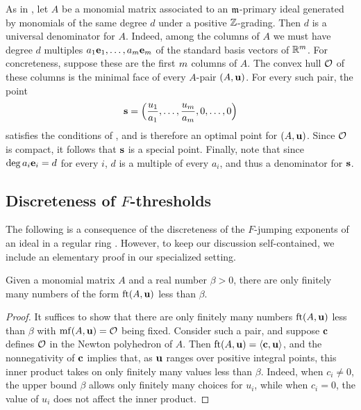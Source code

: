 \documentclass{amsart}
\begin{document}
\begin{example}
   \label{ex: m-primary homogeneous case 2}
   As in , let $A$ be a monomial matrix associated to an $\mathfrak{m}$-primary ideal generated by monomials of the same degree $d$ under a positive $\mathbb{Z}$-grading.
   Then $d$ is a universal denominator for $A$.
   Indeed, among the columns of $A$ we must have degree $d$ multiples $a_1\mathbf{e}_1,\ldots,a_m\mathbf{e}_m$ of the standard basis vectors of $\mathbb{R}^m$.
   For concreteness, suppose these are the first $m$ columns of $A$.
   The convex hull $\mathcal{O}$ of these columns is the minimal face of every $A$-pair $(A,\mathbf{u})$.
   For every such pair, the point
   \[\mathbf{s} = \Big(\frac{u_1}{a_1},\ldots,\frac{u_m}{a_m},0,\ldots,0\Big)\]
   satisfies the conditions of , and is therefore an optimal point for $(A,\mathbf{u})$.
   Since $\mathcal{O}$ is compact, it follows that $\mathbf{s}$ is a special point.
   Finally, note that since $\deg a_i\mathbf{e}_i = d$ for every $i$, $d$ is a multiple of every $a_i$, and thus a denominator for $\mathbf{s}$.
\end{example}

\subsection{Discreteness of $F$-thresholds}

The following is a consequence of the discreteness of the $F$-jumping exponents of an ideal in a regular ring \cite[Theorem~3.1]{blickle+mustata+smith.discr_rat_FPTs}.
However, to keep our discussion self-contained, we include an elementary proof in our specialized setting.

\begin{proposition}
\label{discreteness: P}
Given a monomial matrix $A$ and a real number $\beta > 0 $, there are only finitely many numbers of the form $\operatorname{ft}(A, \mathbf{u})$ less than $\beta$.
\end{proposition}

\begin{proof}
   It suffices to show that there are only finitely many numbers $\operatorname{ft}(A, \mathbf{u})$ less than $\beta$ with $\operatorname{mf}(A, \mathbf{u}) = \mathcal{O}$ being fixed.
   Consider such a pair, and suppose $\mathbf{c}$ defines $\mathcal{O}$ in the Newton polyhedron of $A$.
   Then $\operatorname{ft}(A, \mathbf{u}) = \langle \mathbf{c}, \mathbf{u} \rangle$, and the nonnegativity of $\mathbf{c}$ implies that, as $\mathbf{u}$ ranges over positive integral points, this inner product takes on only finitely many values less than $\beta$.
   Indeed, when $c_i \ne 0$, the upper bound $\beta$ allows only finitely many choices for $u_i$, while when $c_i = 0$, the value of $u_i$ does not affect the inner product.
\end{proof}
\end{document}
